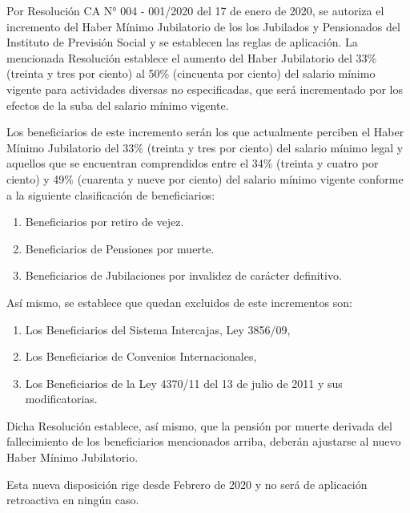 Por Resolución CA N° 004 - 001/2020 del 17 de enero de 2020, se autoriza el incremento del Haber Mínimo Jubilatorio de los los Jubilados y Pensionados del Instituto de Previsión Social y se establecen las reglas de aplicación. La mencionada Resolución establece el aumento del Haber Jubilatorio del 33\% (treinta y tres por ciento) al 50\% (cincuenta por ciento) del  salario mínimo vigente para actividades diversas no especificadas, que será incrementado por los efectos de la suba del salario mínimo vigente.

Los beneficiarios de este incremento serán los que actualmente perciben el Haber Mínimo Jubilatorio del 33\% (treinta y tres por ciento) del salario mínimo legal y aquellos que se encuentran comprendidos entre el 34\% (treinta y cuatro por ciento) y 49\% (cuarenta y nueve por ciento) del salario mínimo vigente conforme a la siguiente clasificación de beneficiarios:

\begin{enumerate}[label=\alph*.]

\item Beneficiarios por retiro de vejez.

\item Beneficiarios de Pensiones por muerte.

\item Beneficiarios de Jubilaciones por invalidez de carácter definitivo.

\end{enumerate}

Así mismo, se establece que quedan excluidos de este incrementos son: 

\begin{enumerate}[label=\alph*.]

\item Los Beneficiarios del Sistema Intercajas, Ley 3856/09, 

\item Los Beneficiarios de Convenios Internacionales,

\item Los Beneficiarios de la Ley 4370/11 del 13 de julio de 2011 y sus modificatorias. 

\end{enumerate}

Dicha Resolución establece, así mismo, que la pensión por muerte derivada del fallecimiento de los beneficiarios mencionados arriba, deberán ajustarse al nuevo Haber Mínimo Jubilatorio.

Esta nueva disposición rige desde Febrero de 2020 y no será de aplicación retroactiva en ningún caso.


